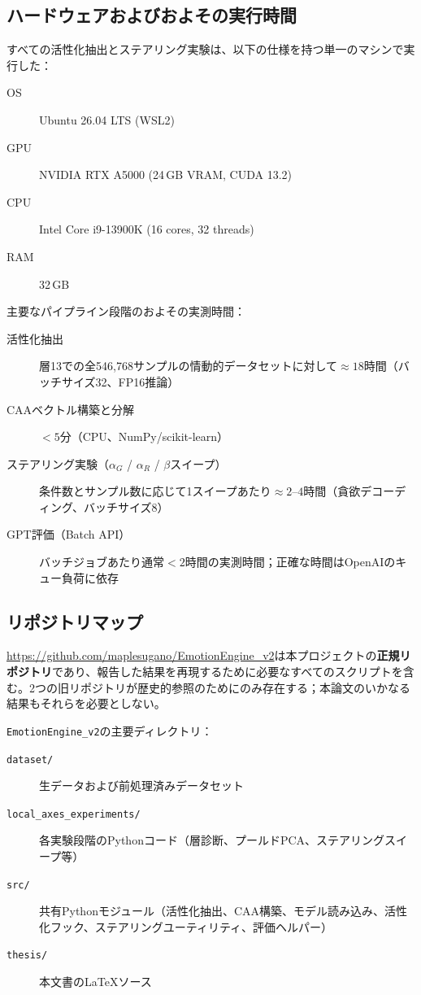 \subsection*{ハードウェアおよびおよその実行時間}

すべての活性化抽出とステアリング実験は、以下の仕様を持つ単一のマシンで実行した：

\begin{description}
  \item[OS] Ubuntu 26.04 LTS (WSL2)
  \item[GPU] NVIDIA RTX A5000 (24\,GB VRAM, CUDA 13.2)
  \item[CPU] Intel Core i9-13900K (16 cores, 32 threads)
  \item[RAM] 32\,GB
\end{description}

主要なパイプライン段階のおよその実測時間：

\begin{description}
  \item[活性化抽出] 層13での全546{,}768サンプルの情動的データセットに対して$\approx 18$時間（バッチサイズ32、FP16推論）
  \item[CAAベクトル構築と分解] $<5$分（CPU、NumPy/scikit-learn）
  \item[ステアリング実験（$\alpha_G$ / $\alpha_R$ / $\beta$スイープ）] 条件数とサンプル数に応じて1スイープあたり$\approx 2$--$4$時間（貪欲デコーディング、バッチサイズ8）
  \item[GPT評価（Batch API）] バッチジョブあたり通常$<2$時間の実測時間；正確な時間はOpenAIのキュー負荷に依存
\end{description}

\subsection*{リポジトリマップ}

\url{https://github.com/maplesugano/EmotionEngine_v2}は本プロジェクトの\textbf{正規リポジトリ}であり、報告した結果を再現するために必要なすべてのスクリプトを含む。2つの旧リポジトリが歴史的参照のためにのみ存在する；本論文のいかなる結果もそれらを必要としない。

\medskip
\noindent \texttt{EmotionEngine\_v2}の主要ディレクトリ：

\begin{description}
  \item[\texttt{dataset/}] 生データおよび前処理済みデータセット
  \item[\texttt{local\_axes\_experiments/}] 各実験段階のPythonコード（層診断、プールドPCA、ステアリングスイープ等）
  \item[\texttt{src/}] 共有Pythonモジュール（活性化抽出、CAA構築、モデル読み込み、活性化フック、ステアリングユーティリティ、評価ヘルパー）
  \item[\texttt{thesis/}] 本文書のLaTeXソース
\end{description}

